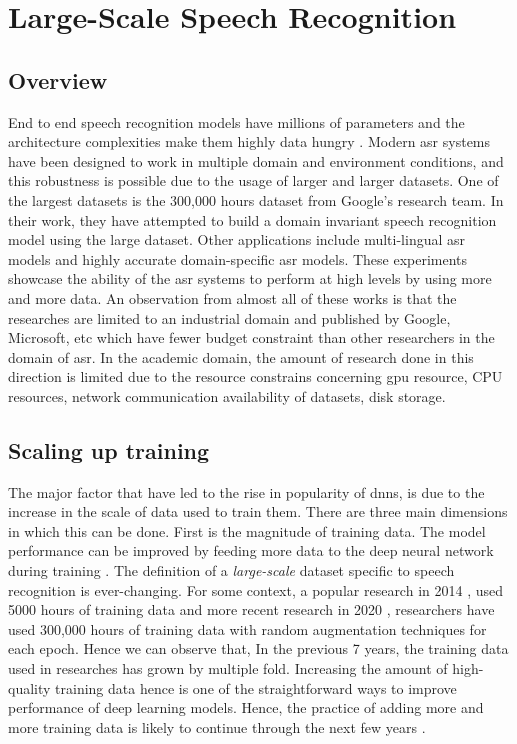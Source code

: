 \chapter{Large-Scale Speech Recognition}
\label{chapter:largescale}

\section{Overview}
End to end speech recognition models have millions of parameters and the architecture complexities make them highly data hungry \cite{Li2020OnRecognition}. Modern \acrshort{asr} systems have been designed to work in multiple domain and environment conditions, and this robustness is possible due to the usage of larger and larger datasets. One of the largest datasets is the 300,000 hours dataset from Google's research team. In their work, they have attempted to build a domain invariant speech recognition model using the large dataset\cite{Narayanan2019TowardTraining}. Other applications include multi-lingual \acrshort{asr} models \cite{Kannan2019Large-ScaleModel} and highly accurate domain-specific \acrshort{asr} models. These experiments showcase the ability of the \acrshort{asr} systems to perform at high levels by using more and more data. An observation from almost all of these works is that the researches are limited to an industrial domain and published by Google, Microsoft, etc which have fewer budget constraint than other researchers in the domain of \acrshort{asr}. In the academic domain, the amount of research done in this direction is limited due to the resource constrains concerning \acrshort{gpu} resource, CPU resources, network communication availability of datasets, disk storage. 

\section{Scaling up training}
The major factor that have led to the rise in popularity of \acrshort{dnn}s, is due to the increase in the scale of data used to train them. There are three main dimensions in which this can be done. First is the magnitude of training data. The model performance can be improved by feeding more data to the deep neural network during training \cite{Hestness2017DEEPEMPIRICALLY}. The definition of a \emph{large-scale} dataset specific to speech recognition is ever-changing. For some context, a popular research in 2014 \cite{Hannun2014DeepRecognition}, used 5000 hours of training data and more recent research in 2020 \cite{Narayanan2019RECOGNIZINGMODELS}, researchers have used 300,000 hours of training data with random augmentation techniques for each epoch. Hence we can observe that, In the previous 7 years, the training data used in researches has grown by multiple fold. Increasing the amount of high-quality training data hence is one of the straightforward ways to improve performance of deep learning models. Hence, the practice of adding more and more training data is likely to continue through the next few years \cite{Mayer2020ScalableInfrastructures}. 



